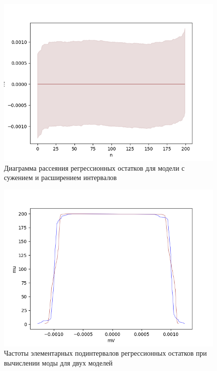 \begin{figure}[ht]
	\begin{center}
		\includegraphics[scale = 0.55]{../images/analysis_of_regression_residuals_0.png}
	\end{center}
	\caption{Диаграмма рассеяния регрессионных остатков для модели с сужением и расширением интервалов} \label{pic:with_reduction}
\end{figure}

\begin{figure}[ht]
	\begin{center}
		\includegraphics[scale = 0.55]{../images/mu.png}
	\end{center}
	\caption{Частоты элементарных подинтервалов регрессионных остатков при вычислении моды для двух моделей} \label{pic:freq}
\end{figure} 

